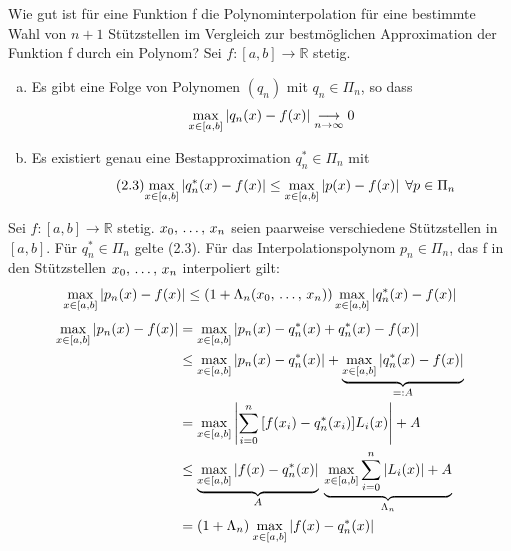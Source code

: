 Wie gut ist für eine Funktion f die Polynominterpolation für eine bestimmte Wahl
von $n + 1$ Stützstellen im Vergleich zur bestmöglichen Approximation der Funktion f
durch ein Polynom?
 Sei $f:[a, b] \longrightarrow \mathbb{R}$ stetig.
\begin{enumerate}[(a)]
  \item Es gibt eine Folge von Polynomen $(q_n)$ mit $q_n \in \Pi_n$, so dass
    \begin{equation*}
      \underset{x \in [a, b]}{\max} \left| q_n(x) - f(x) \right| \underset{n \to \infty}{\longrightarrow} 0
    \end{equation*}
  \item Es existiert genau eine Bestapproximation $q_n^* \in \Pi_n$ mit
    \begin{equation}
      \tag{2.3}
      \underset{x \in [a, b]}{\max} \left| q_n^*(x) - f(x) \right| \leq \underset{x \in [a, b]}{\max} \left| p(x) - f(x) \right| \; \forall p \in \Pi_n
    \end{equation}
\end{enumerate}
 Sei $f:[a, b] \longrightarrow \mathbb{R}$ stetig. $x_0,\,\ldots,\,x_n$
seien paarweise verschiedene Stützstellen in $[a, b]$. Für $q_n^* \in \Pi_n$ gelte
(2.3). Für das Interpolationspolynom $p_n \in \Pi_n$, das f in den Stützstellen
$x_0,\,\ldots,\,x_n$ interpoliert gilt:
\begin{equation*}
  \underset{x \in [a, b]}{\max} \left| p_n(x) - f(x) \right| \leq (1 + \Lambda_n(x_0,\,\ldots,\,x_n))\,\underset{x \in [a, b]}{\max} \left| q_n^*(x) - f(x) \right|
\end{equation*}
\begin{align*}
  \underset{x \in [a, b]}{\max} \left| p_n(x) - f(x) \right| &= \underset{x \in [a, b]}{\max} \left| p_n(x) - q_n^*(x) + q_n^*(x) - f(x) \right|\\
  &\leq \underset{x \in [a, b]}{\max} \left| p_n(x) - q_n^*(x) \right| + \underbrace{\underset{x \in [a, b]}{\max} \left| q_n^*(x) - f(x) \right|}_{=:A}\\
  &= \underset{x \in [a, b]}{\max} \left| \sum\limits_{i=0}^{n}{[}f(x_i) - q_n^*(x_i)]L_i(x) \right| + A\\
  &\leq \underbrace{\underset{x \in [a, b]}{\max} \left| f(x) - q_n^*(x) \right|}_A \: \underbrace{ \underset{x \in [a, b]}{\max} \sum\limits_{i=0}^{n}{\left|  L_{i}(x)  \right|} + A}_{\Lambda_n} \\
  &= (1 + \Lambda_n) \: \underset{x \in [a, b]}{\max} \left| f(x) - q_n^*(x) \right|
\end{align*}
